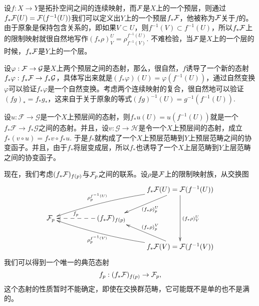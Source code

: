 \begin{para}[顺像]\label{sx}
设$f:X\to Y$是拓扑空间之间的连续映射，而$\mathcal{F}$是$X$上的一个预层，则通过$f_*\mathcal{F}(U)=\mathcal{F}(f^{-1}(U))$我们可以定义出$Y$上的一个预层$f_*\mathcal{F}$，他被称为$\mathcal{F}$关于$f$的。 由于原象是保持包含关系的，即如果$V\subset U$，则$f^{-1}(V)\subset f^{-1}(U)$，所以$f_*\mathcal{F}$上的限制映射就很自然地写作$(f_*\rho)^U_V=\rho^{f^{-1}(U)}_{f^{-1}(V)}$. 不难检验，当$\mathcal{F}$是$X$上的一个层的时候，$f_*\mathcal{F}$是$Y$上的一个层。

设$\varphi:\mathcal{F}\to\mathcal{G}$是$X$上两个预层之间的态射，那么，很自然，$f$诱导了一个新的态射$f_*\varphi:f_*\mathcal{F}\to f_*\mathcal{G}$，具体写出来就是$(f_*\varphi)(U)=\varphi(f^{-1}(U))$，通过自然变换$\varphi$可以验证$f_*\varphi$是一个自然变换。考虑两个连续映射的复合，很自然地可以验证$(f g)_*=f_* g_*$，这来自于关于原象的等式$(fg)^{-1}(U)=g^{-1}(f^{-1}(U))$. 

设$u:\mathcal{F}\to\mathcal{G}$是一个$X$上预层间的态射，则$f_*u(U)=u(f^{-1}(U))$就是一个$f_*\mathcal{F}\to f_*\mathcal{G}$之间的态射。并且，设$v:\mathcal{G}\to\mathcal{H}$是令一个$X$上预层间的态射，成立$f_*(v\circ u)=f_*v\circ f_* u$. 于是$f_*$就构成了一个$X$上预层范畴到$Y$上预层范畴之间的协变函子。并且，由于$f_*$将层变成层，所以$f_*$也诱导了一个$X$上层范畴到$Y$上层范畴之间的协变函子。
\end{para}



现在，我们考虑$(f_*\mathcal{F})_{f(p)}$与$\mathcal{F}_p$之间的联系。设$\rho$是$\mathcal{F}$上的限制映射族，从交换图
\[
	\xymatrix{
		&&&f_*\calf(U)=\calf(f^{-1}(U))\ar[dl]^{(f_*\rho)_{p}^U}\ar[dd]^{(f_*\rho)^U_{V}}\ar@/_/[llld]_-{\rho_{p}^{f^{-1}(U)}} \\
		\calf_p&&(f_*\calf)_{f(p)}\ar@{-->}[ll]_-{f_p}&\\
		&&&f_*\calf(V)=\calf(f^{-1}(V))\ar[ul]_{(f_*\rho)_{p}^V}\ar@/^/[lllu]^-{\rho_{p}^{f^{-1}(V)}}
	}
\]
我们可以得到一个唯一的典范态射
\[
f_p:(f_*\mathcal{F})_{f(p)}\to \mathcal{F}_p,
\]
这个态射的性质暂时不能确定，即使在交换群范畴，它可能既不是单的也不是满的。

